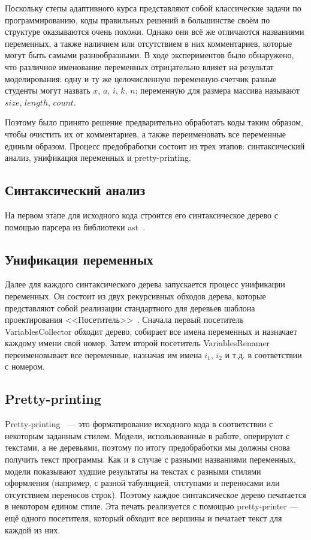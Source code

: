\documentclass[14pt]{matmex-diploma-custom}
\begin{document}
Поскольку степы адаптивного курса представляют собой классические задачи по программированию, коды правильных решений в большинстве своём по структуре оказываются очень похожи. Однако они всё же отличаются названиями переменных, а также наличием или отсутствием в них комментариев, которые могут быть самыми разнообразными. В ходе экспериментов было обнаружено, что различное именование переменных отрицательно влияет на результат моделирования: одну и ту же целочисленную переменную-счетчик разные студенты могут назвать $x$, $a$, $i$, $k$, $n$; переменную для размера массива называют $size$, $length$, $count$.

Поэтому было принято решение предварительно обработать коды таким образом, чтобы очистить их от комментариев, а также переименовать все переменные единым образом. Процесс предобработки состоит из трех этапов: синтаксический анализ, унификация переменных и pretty-printing.

\subsection*{Синтаксический анализ}
На первом этапе для исходного кода строится его синтаксическое дерево с помощью парсера из библиотеки ast~\cite{ast}.

\subsection*{Унификация переменных}
Далее для каждого синтаксического дерева запускается процесс унификации переменных. Он состоит из двух рекурсивных обходов дерева, которые представляют собой реализации стандартного для деревьев шаблона проектирования <<Посетитель>>~\cite{DesignPatterns}. Сначала первый посетитель VariablesCollector обходит дерево, собирает все имена переменных и назначает каждому имени свой номер. Затем второй посетитель VariablesRenamer переименовывает все переменные, назначая им имена $i_1$, $i_2$ и т.д. в соответствии с номером.

\subsection*{Pretty-printing}
Pretty-printing~\cite{pretty-printing} --- это форматирование исходного кода в соответствии с некоторым заданным стилем. Модели, использованные в работе, оперируют с текстами, а не деревьями, поэтому по итогу предобработки мы должны снова получить текст программы. Как и в случае с разными названиями переменных, модели показывают худшие результаты на текстах с разными стилями оформления (например, с разной табуляцией, отступами и переносами или отсутствием переносов строк). Поэтому каждое синтаксическое дерево печатается в некотором едином стиле. Эта печать реализуется с помощью pretty-printer --- ещё одного посетителя, который обходит все вершины и печатает текст для каждой из них.
\end{document}
